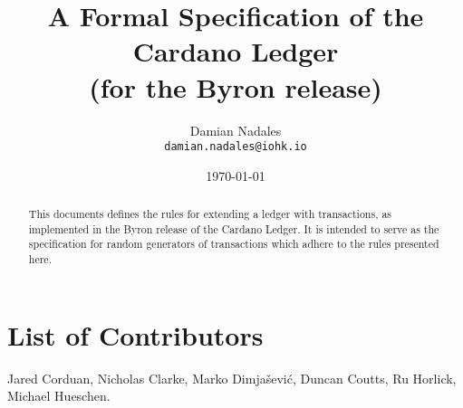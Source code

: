 
\title{
  A Formal Specification of the Cardano Ledger\\
  \small{(for the Byron release)}
}

\author{Damian Nadales \\
  {\small \texttt{damian.nadales@iohk.io}}\\
}

\date{\today}

\maketitle

\begin{abstract}
  This documents defines the rules for extending a ledger with transactions, as
  implemented in the Byron release of the Cardano Ledger. It is intended to
  serve as the specification for random generators of transactions which adhere
  to the rules presented here.
\end{abstract}

\section*{List of Contributors}
\label{acknowledgements}

Jared Corduan, Nicholas Clarke, Marko Dimjašević, Duncan Coutts, Ru Horlick,
Michael Hueschen.
